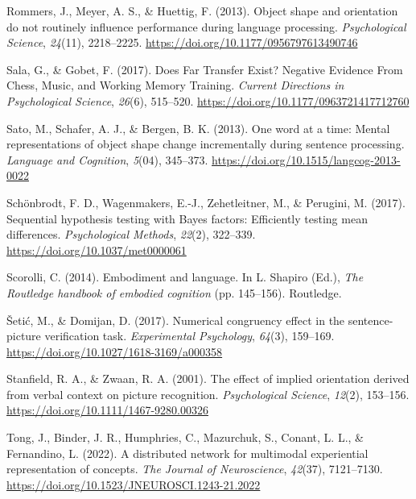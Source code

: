 \documentclass[
  man,floatsintext]{apa7}
\newlength{\cslhangindent}
\newlength{\cslentryspacingunit} %
\newenvironment{CSLReferences}[2] %
 {%
  \setlength{\parindent}{0pt}
  \ifodd #1
  \let\oldpar\par
  \def\par{\hangindent=\cslhangindent\oldpar}
  \fi
  \setlength{\parskip}{#2\cslentryspacingunit}
 }%
 {}
\begin{document}
\begin{CSLReferences}{1}{0}
\leavevmode{}%
Rommers, J., Meyer, A. S., \& Huettig, F. (2013). Object shape and orientation do not routinely influence performance during language processing. \emph{Psychological Science}, \emph{24}(11), 2218--2225. \url{https://doi.org/10.1177/0956797613490746}

\leavevmode{}%
Sala, G., \& Gobet, F. (2017). Does Far Transfer Exist? Negative Evidence From Chess, Music, and Working Memory Training. \emph{Current Directions in Psychological Science}, \emph{26}(6), 515--520. \url{https://doi.org/10.1177/0963721417712760}

\leavevmode{}%
Sato, M., Schafer, A. J., \& Bergen, B. K. (2013). One word at a time: {Mental} representations of object shape change incrementally during sentence processing. \emph{Language and Cognition}, \emph{5}(04), 345--373. \url{https://doi.org/10.1515/langcog-2013-0022}

\leavevmode{}%
Schönbrodt, F. D., Wagenmakers, E.-J., Zehetleitner, M., \& Perugini, M. (2017). Sequential hypothesis testing with {Bayes} factors: {Efficiently} testing mean differences. \emph{Psychological Methods}, \emph{22}(2), 322--339. \url{https://doi.org/10.1037/met0000061}

\leavevmode{}%
Scorolli, C. (2014). Embodiment and language. In L. Shapiro (Ed.), \emph{The {Routledge} handbook of embodied cognition} (pp. 145--156). {Routledge}.

\leavevmode{}%
Šetić, M., \& Domijan, D. (2017). Numerical {congruency effect} in the {sentence-picture verification task}. \emph{Experimental Psychology}, \emph{64}(3), 159--169. \url{https://doi.org/10.1027/1618-3169/a000358}

\leavevmode{}%
Stanfield, R. A., \& Zwaan, R. A. (2001). The effect of implied orientation derived from verbal context on picture recognition. \emph{Psychological Science}, \emph{12}(2), 153--156. \url{https://doi.org/10.1111/1467-9280.00326}

\leavevmode{}%
Tong, J., Binder, J. R., Humphries, C., Mazurchuk, S., Conant, L. L., \& Fernandino, L. (2022). A distributed network for multimodal experiential representation of concepts. \emph{The Journal of Neuroscience}, \emph{42}(37), 7121--7130. \url{https://doi.org/10.1523/JNEUROSCI.1243-21.2022}


\end{CSLReferences}
\end{document}

